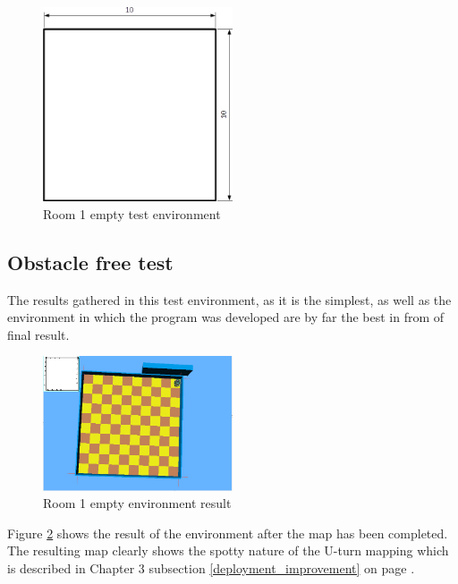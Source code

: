 \begin{figure}[h]
\centering
\includegraphics[width = 0.5\textwidth]{../../figures/room1_empty.png}
\caption{Room 1 empty test environment}
\label{room1_empty}
\end{figure}

\subsection{Obstacle free test}

The results gathered in this test environment, as it is the simplest, as well as the environment in which the program was developed are by far the best in from of final result. \\

\begin{figure}[h]
\centering
\includegraphics[width = 0.5\textwidth]{../../figures/map_results/result_room1_empty.png}
\caption{Room 1 empty environment result}
\label{room1_empty_result}
\end{figure}

Figure \ref{room1_empty_result} shows the result of the environment after the map has been completed. The resulting map clearly shows the spotty nature of the U-turn mapping which is described in Chapter 3 subsection \ref{deployment_improvement} on page \pageref{deployment_improvement} . \\[3ex]

